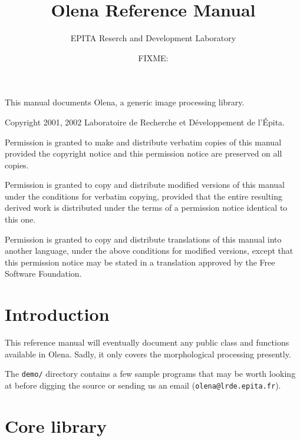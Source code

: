 \documentclass{book}
\newcommand\var\textit
\begin{document}
\title{Olena Reference Manual}
\author{EPITA Reserch and Development Laboratory}
\date{FIXME:}
\maketitle


This manual documents Olena, a generic image processing library.

Copyright 2001, 2002  Laboratoire de Recherche et D\'eveloppement de l'\'Epita.

Permission is granted to make and distribute verbatim
copies of this manual provided the copyright notice and
this permission notice are preserved on all copies.


Permission is granted to copy and distribute modified versions of this
manual under the conditions for verbatim copying, provided that the
entire resulting derived work is distributed under the terms of a
permission notice identical to this one.

Permission is granted to copy and distribute
translations of this manual into another language,
under the above conditions for modified versions,
except that this permission notice may be stated in a
translation approved by the Free Software Foundation.

\newpage

\chapter{Introduction}

This reference manual will eventually document any public class and
functions available in Olena.  Sadly, it only covers the morphological
processing presently.

The \texttt{demo/} directory contains a few sample programs that may be
worth looking at before digging the source or sending us an email
(\texttt{olena@lrde.epita.fr}).


\chapter{Core library}
\end{document}
